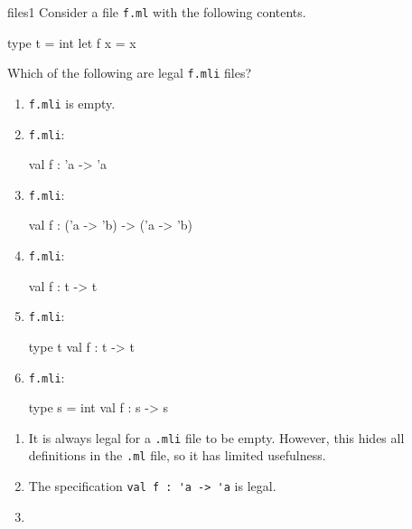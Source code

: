 %
%
%

%
\exercises

\begin{exercise}{files1}
Consider a file \hbox{\lstinline+f.ml+} with the following contents.
\begin{ocaml}
type t = int
let f x = x
\end{ocaml}
%
Which of the following are legal \hbox{\lstinline+f.mli+} files?

\begin{enumerate}
\item \lstinline+f.mli+ is empty.

\item \lstinline+f.mli+:
\begin{ocaml}
val f : 'a -> 'a
\end{ocaml}

\item \lstinline+f.mli+:
\begin{ocaml}
val f : ('a -> 'b) -> ('a -> 'b)
\end{ocaml}

\item \lstinline+f.mli+:
\begin{ocaml}
val f : t -> t
\end{ocaml}

\item \lstinline+f.mli+:
\begin{ocaml}
type t
val f : t -> t
\end{ocaml}

\item \lstinline+f.mli+:
\begin{ocaml}
type s = int
val f : s -> s
\end{ocaml}
\end{enumerate}

\begin{answer}\ifanswers
\begin{enumerate}
\item

It is always legal for a \hbox{\lstinline+.mli+} file to be empty.
However, this hides all definitions in the \hbox{\lstinline+.ml+}
file, so it has limited usefulness.

\item

The specification \hbox{\lstinline+val f : 'a -> 'a+} is legal.

\item


\end{enumerate}
\end{answer}
\end{exercise}
